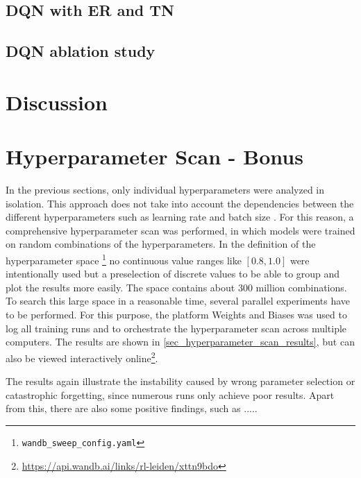 \documentclass{article}
\begin{document}
\subsection{DQN with ER and TN}

\subsection{DQN ablation study}

\section{Discussion}
\label{sec_discussion}


\section{Hyperparameter Scan - Bonus}
\label{sec_bonus}
In the previous sections, only individual hyperparameters were analyzed in isolation. 
This approach does not take into account the dependencies between the different hyperparameters 
such as learning rate and batch size \cite{DBLP:conf/iclr/SmithKYL18}. 
For this reason, a comprehensive hyperparameter scan was performed, in which models were trained on random combinations of the hyperparameters. 
In the definition of the hyperparameter space \footnote{\texttt{wandb\_sweep\_config.yaml}} 
no continuous value ranges like $[0.8, 1.0]$ were intentionally used but a preselection of discrete values to be able to group and plot the results more easily. 
The space contains about 300 million combinations. 
To search this large space in a reasonable time, several parallel experiments have to be performed. 
For this purpose, the platform Weights and Biases \cite{wandb} was used to log all training runs and to orchestrate the hyperparameter scan across multiple computers. 
The results are shown in \autoref{sec_hyperparameter_scan_results}, 
but can also be viewed interactively online\footnote{\url{https://api.wandb.ai/links/rl-leiden/xttn9bdo}}. 

The results again illustrate the instability caused by wrong parameter selection or catastrophic forgetting, 
since numerous runs only achieve poor results.
Apart from this, there are also some positive findings, such as .....

\nocite{DBLP:books/sp/Plaat22}
\end{document}
